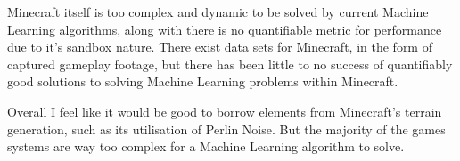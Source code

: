 \begin{flushleft}
                        \begin{figure}[h]
                            \centering
                            \qquad
                        \end{figure}

                        Minecraft itself is too complex and dynamic to be solved by current Machine Learning algorithms, along with there is no quantifiable 
                        metric for performance due to it's sandbox nature. There exist data sets for Minecraft, in the form of captured gameplay footage, but
                        there has been little to no success of quantifiably good solutions to solving Machine Learning problems within Minecraft. \\

                        \vspace{0.2cm}

                        Overall I feel like it would be good to borrow elements from Minecraft's terrain generation, such as its utilisation of Perlin Noise.
                        But the majority of the games systems are way too complex for a Machine Learning algorithm to solve. \\


\end{flushleft}
